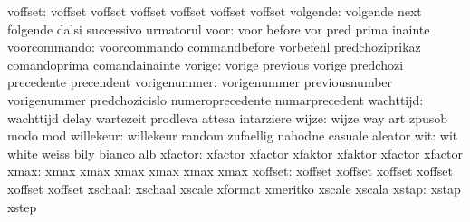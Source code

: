                   voffset: voffset                   voffset
                           voffset                   voffset
                           voffset                   voffset
                 volgende: volgende                  next
                           folgende                  dalsi
                           successivo                urmatorul
                     voor: voor                      before
                           vor                       pred
                           prima                     inainte
             voorcommando: voorcommando              commandbefore
                           vorbefehl                 predchoziprikaz
                           comandoprima              comandainainte
                   vorige: vorige                    previous
                           vorige                    predchozi
                           precedente                precendent
             vorigenummer: vorigenummer              previousnumber
                           vorigenummer              predchozicislo
                           numeroprecedente          numarprecedent
                wachttijd: wachttijd                 delay
                           wartezeit                 prodleva
                           attesa                    intarziere
                    wijze: wijze                     way
                           art                       zpusob
                           modo                      mod
                willekeur: willekeur                 random
                           zufaellig                 nahodne
                           casuale                   aleator
                      wit: wit                       white
                           weiss                     bily
                           bianco                    alb
                  xfactor: xfactor                   xfactor
                           xfaktor                   xfaktor
                           xfactor                   xfactor %
                     xmax: xmax                      xmax
                           xmax                      xmax
                           xmax                      xmax %
                  xoffset: xoffset                   xoffset
                           xoffset                   xoffset
                           xoffset                   xoffset %
                  xschaal: xschaal                   xscale
                           xformat                   xmeritko
                           xscale                    xscala %
                    xstap: xstap                     xstep
